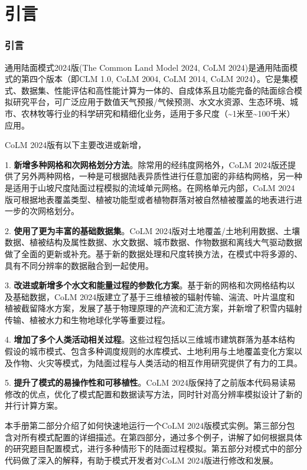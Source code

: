 \part{引言}
\section{引言}

通用陆面模式2024版(The Common Land Model 2024, CoLM 2024)是通用陆面模式的第四个版本（即CLM 1.0, CoLM 2004, CoLM 2014, CoLM 2024）。它是集模式、数据集、性能评估和高性能计算为一体的、自成体系且功能完备的陆面综合模拟研究平台，可广泛应用于数值天气预报/气候预测、水文水资源、生态环境、城市、农林牧等行业的科学研究和精细化业务，适用于多尺度（\textasciitilde 1米至\textasciitilde 100千米）应用。

CoLM 2024版有以下主要改进或新增，

1. \textbf{新增多种网格和次网格划分方法}。除常用的经纬度网格外，CoLM 2024版还提供了另外两种网格，一种是可根据陆表异质性进行任意加密的非结构网格，另一种是适用于山坡尺度陆面过程模拟的流域单元网格。在网格单元内部，CoLM 2024版可根据地表覆盖类型、植被功能型或者植物群落对被自然植被覆盖的地表进行进一步的次网格划分。

2. \textbf{使用了更为丰富的基础数据集}。CoLM 2024版对土地覆盖/土地利用数据、土壤数据、植被结构及属性数据、水文数据、城市数据、作物数据和离线大气驱动数据做了全面的更新或补充。基于新的数据处理和尺度转换方法，在模式中将多源的、具有不同分辨率的数据融合到一起使用。

3. \textbf{改进或新增多个水文和能量过程的参数化方案}。基于新的网格和次网格结构以及基础数据，CoLM 2024版建立了基于三维植被的辐射传输、湍流、叶片温度和植被截留降水方案，发展了基于物理原理的产流和汇流方案，并新增了积雪内辐射传输、植被水力和生物地球化学等重要过程。

4. \textbf{增加了多个人类活动相关过程}。这些过程包括以三维城市建筑群落为基本结构假设的城市模式、包含多种调度规则的水库模式、土地利用与土地覆盖变化方案以及作物、火灾等模式，为陆面过程与人类活动的相互作用研究提供了有力的工具。

5. \textbf{提升了模式的易操作性和可移植性}。CoLM 2024版保持了之前版本代码易读易修改的优点，优化了模式配置和数据读写方法，同时针对高分辨率模拟设计了新的并行计算方案。

本手册第二部分介绍了如何快速地运行一个CoLM 2024版模式实例。第三部分包含对所有模式配置的详细描述。在第四部分，通过多个例子，讲解了如何根据具体的研究题目配置模式，进行多种情形下的陆面过程模拟。第五部分对模式中的部分代码做了深入的解释，有助于模式开发者对CoLM 2024版进行修改和发展。

\clearpage

